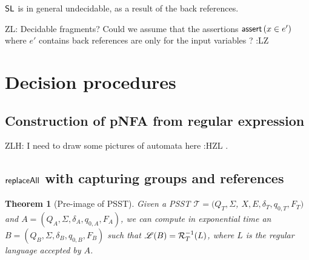 \documentclass[sigplan,review,anonymous]{acmart}\settopmatter{printfolios=true,printccs=false,printacmref=false}
\newcommand{\zhilin}[1]{\color{brown} {ZL: #1 :LZ} \color{black}}
\newcommand{\zhilei}[1]{\color{green} {ZLH: #1 :HZL} \color{black}}
\newcommand{\zhilin}[1]{}
\newcommand{\zhilei}[1]{}
\newtheorem{theorem}{Theorem}
\newcommand\PSST{{\sf PSST}}
\newcommand\psst{\mathcal{T}}
\begin{document}
$\mathsf{SL}$ is in general undecidable, as a result of the back references.

\zhilin{Decidable fragments? Could we assume that the assertions $\textsf{assert}\left(x \in e'\right)$ where $e'$ contains back references are only for the input variables ?}


\section{Decision procedures}

\subsection{Construction of pNFA from regular expression}
\label{pNFA_cons}

\zhilei{I need to draw some pictures of automata here}.

\subsection{$\mathsf{replaceAll}$ with capturing groups and references}

\begin{theorem}[Pre-image of \PSST{}]
  Given a \PSST{} $\psst = (Q_T, \Sigma$, $X, E, \delta_T, q_{0, T}, F_T)$ and \FA{} $A
  = (Q_A, \Sigma, \delta_A, q_{0, A}, F_A)$, we can compute in exponential time an \FA{} $B = (Q_B,
  \Sigma, \delta_B, q_{0, B}, F_B)$ such that $\mathscr{L}(B) = \mathcal{R}^{-1}_T(L)$, where $L$ is the regular language accepted by $A$. 
\end{theorem}
 
\end{document}
